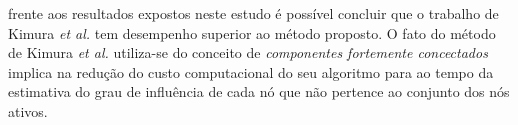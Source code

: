 \documentclass{acm_proc_article-sp}
\begin{document}
frente aos resultados expostos neste estudo é possível concluir que o trabalho de Kimura \textit{et al.} tem
desempenho superior ao método proposto. O fato do  método de Kimura \textit{et al.} utiliza-se do conceito de
\textit{componentes fortemente concectados} implica na redução do custo computacional do seu algoritmo para ao
tempo da estimativa do grau de influência de cada nó que não pertence ao conjunto dos nós ativos.



 
\end{document}
